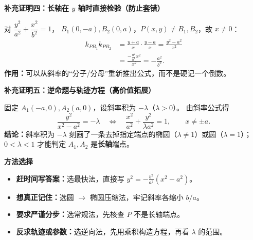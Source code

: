 \clearpage
\begin{proofbox}
\textbf{\textcolor{CProof}{补充证明四：长轴在 $y$ 轴时直接检验（防止套错）}}


对 $\dfrac{y^2}{a^2}+\dfrac{x^2}{b^2}=1$，
$B_1(0,-a),B_2(0,a)$，$P(x,y)\ne B_1,B_2$，故 $x\ne0$：
\[
 \begin{aligned}
 k_{PB_1}k_{PB_2}
 &=\frac{y+a}{x}\cdot\frac{y-a}{x}
 =\frac{y^2-a^2}{x^2}\\
 &=\frac{-\frac{a^2}{b^2}x^2}{x^2}
 =\boxed{-\frac{a^2}{b^2}}.
 \end{aligned}
\]
\textbf{作用：}可以从斜率的“分子/分母”重新推出公式，而不是硬记一个倒数。

\end{proofbox}
\clearpage
\begin{proofbox}
\textbf{\textcolor{CProof}{补充证明五：逆命题与轨迹方程（高价值拓展）}}


固定 $A_1(-a,0),A_2(a,0)$，设斜率积为 $-\lambda$（$\lambda>0$）。
由斜率公式得
\[
 \frac{y^2}{x^2-a^2}=-\lambda
 \quad\Longleftrightarrow\quad
 \frac{x^2}{a^2}+\frac{y^2}{\lambda a^2}=1,
 \qquad x\ne\pm a.
\]
\textbf{结论：}斜率积为 $-\lambda$ 刻画了一条去掉指定端点的椭圆（$\lambda\ne1$）或圆（$\lambda=1$）；
$0<\lambda<1$ 才能判定 $A_1,A_2$ 是\textbf{长轴}端点。

\medskip
\textbf{\textcolor{CProof}{方法选择}}
\begin{itemize}[leftmargin=*,itemsep=0.2em]
 \item \textbf{赶时间写答案：}选最快法，直接写 $y^2=-\frac{b^2}{a^2}(x^2-a^2)$。
 \item \textbf{想真正记住：}选圆 $\to$ 椭圆压缩法，牢记斜率各缩小 $b/a$。
 \item \textbf{要求严谨分步：}选常规法，先核查 $P$ 不是长轴端点。
 \item \textbf{反求轨迹或参数：}选逆向法，先用乘积构造方程，再看 $\lambda$ 的范围。
\end{itemize}
\end{proofbox}
